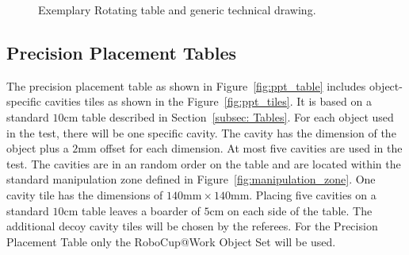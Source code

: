 \begin{figure}[h!]
	\centering
	\hspace{0.05\textwidth}
	\caption{Exemplary Rotating table and generic technical drawing.}%
	\label{fig:rottable}
\end{figure}


\subsection{Precision Placement Tables}\label{sec:Precision Placement}

The precision placement table as shown in Figure~\ref{fig:ppt_table} includes object-specific cavities tiles as shown in the Figure~\ref{fig:ppt_tiles}. It is based on a standard $10\si{\centi\meter}$ table described in Section~\ref{subsec: Tables}. For each object used in the test, there will be one specific cavity. The cavity has the dimension of the object plus a $2 \si{\milli\meter}$ offset for each dimension. At most five cavities are used in the test. The cavities are in an random order on the table and are located within the standard manipulation zone defined in Figure~\ref{fig:manipulation_zone}. One cavity tile has the dimensions of $140 \si{\milli\meter} \times 140 \si{\milli\meter} $. Placing five cavities on a standard $10\si{\centi\meter}$ table leaves a boarder of $5 \si{\centi\meter}$ on each side of the table. The additional decoy cavity tiles will be chosen by the referees. For the Precision Placement Table only the RoboCup@Work Object Set will be used.
\clearpage

